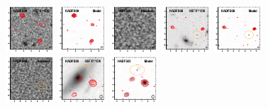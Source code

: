\documentclass[iop]{emulateapj}
\begin{document}
\begin{figure}[!tbp]
\begin{centering}
\includegraphics[width=0.162\textwidth]{HADFS09_optical_bestfit.pdf}
\includegraphics[width=0.162\textwidth]{HADFS09_model_bestfit.pdf}
\includegraphics[width=0.162\textwidth]{HADFS09_residual_bestfit.pdf}
\includegraphics[width=0.162\textwidth]{HADFS08_optical_bestfit.pdf}
\includegraphics[width=0.162\textwidth]{HADFS08_model_bestfit.pdf}
\includegraphics[width=0.162\textwidth]{HADFS08_residual_bestfit.pdf}
\includegraphics[width=0.162\textwidth]{HADFS03_optical_bestfit.pdf}
\includegraphics[width=0.162\textwidth]{HADFS03_model_bestfit.pdf}

\end{centering}
\end{figure}
\end{document}
